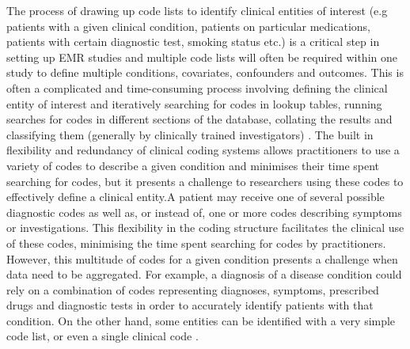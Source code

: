 \documentclass[10pt]{article}
\begin{document}
The process of drawing up code lists to identify clinical entities of interest (e.g patients with a given clinical condition, patients on particular medications, patients with certain diagnostic test, smoking status etc.) is a critical step in setting up EMR studies and multiple code lists will often be required within one study to define multiple conditions, covariates, confounders and outcomes.  This is often a complicated and time-consuming process involving defining the clinical entity of interest and iteratively searching for codes in lookup tables, running searches for codes in different sections of the database, collating the results and classifying them (generally by clinically trained investigators) \cite{Dave2009, Nicholson2013}.  The built in flexibility and redundancy of clinical coding systems allows practitioners to use a variety of codes to describe a given condition and minimises their time spent searching for codes, but it presents a challenge to researchers using these codes to effectively define a clinical entity.A patient may receive one of several possible diagnostic codes as well as, or instead of, one or more codes describing symptoms or investigations. This flexibility in the coding structure facilitates the clinical use of these codes, minimising the time spent searching for codes by practitioners. However, this multitude of codes for a given condition presents a challenge when data need to be aggregated. For example, a diagnosis of a disease condition could rely on a combination of codes representing diagnoses, symptoms, prescribed drugs and diagnostic tests in order to accurately identify patients with that condition.  On the other hand, some entities can be identified with a very simple code list, or even a single clinical code \cite{Kotz2011}.
\end{document}
